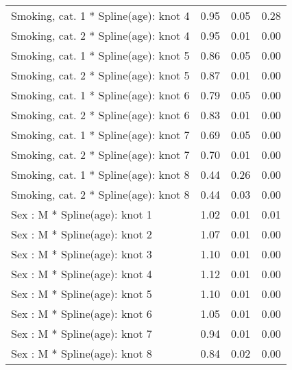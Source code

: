 \documentclass[risks,article,submit,moreauthors,pdftex]{Definitions/mdpi}
\begin{document}
\begin{longtable}{lrrr}
Smoking, cat. 1 * Spline(age): knot 4 & 0.95 & 0.05 & 0.28 \\ 
Smoking, cat. 2 * Spline(age): knot 4 & 0.95 & 0.01 & 0.00 \\ 
Smoking, cat. 1 * Spline(age): knot 5 & 0.86 & 0.05 & 0.00 \\ 
Smoking, cat. 2 * Spline(age): knot 5 & 0.87 & 0.01 & 0.00 \\ 
Smoking, cat. 1 * Spline(age): knot 6 & 0.79 & 0.05 & 0.00 \\ 
Smoking, cat. 2 * Spline(age): knot 6 & 0.83 & 0.01 & 0.00 \\ 
Smoking, cat. 1 * Spline(age): knot 7 & 0.69 & 0.05 & 0.00 \\ 
Smoking, cat. 2 * Spline(age): knot 7 & 0.70 & 0.01 & 0.00 \\ 
Smoking, cat. 1 * Spline(age): knot 8 & 0.44 & 0.26 & 0.00 \\ 
Smoking, cat. 2 * Spline(age): knot 8 & 0.44 & 0.03 & 0.00 \\ 
Sex : M * Spline(age): knot 1 & 1.02 & 0.01 & 0.01 \\ 
Sex : M * Spline(age): knot 2 & 1.07 & 0.01 & 0.00 \\ 
Sex : M * Spline(age): knot 3 & 1.10 & 0.01 & 0.00 \\ 
Sex : M * Spline(age): knot 4 & 1.12 & 0.01 & 0.00 \\ 
Sex : M * Spline(age): knot 5 & 1.10 & 0.01 & 0.00 \\ 
Sex : M * Spline(age): knot 6 & 1.05 & 0.01 & 0.00 \\ 
Sex : M * Spline(age): knot 7 & 0.94 & 0.01 & 0.00 \\ 
Sex : M * Spline(age): knot 8 & 0.84 & 0.02 & 0.00 \\ 
\bottomrule
\end{longtable}

\newpage


\vspace{6pt}


\end{document}
